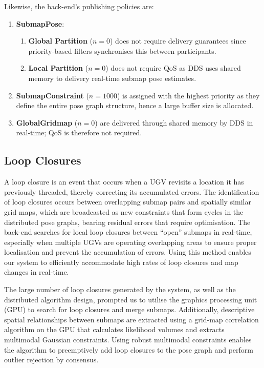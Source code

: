 
Likewise, the back-end’s publishing policies are:
\begin{enumerate}
	\item \textbf{SubmapPose}:
	\begin{enumerate}
		\item \textbf{Global Partition} ($n = 0$) does not require delivery guarantees since priority-based filters synchronises this between participants.
		\item \textbf{Local Partition} ($n = 0$) does not require QoS as DDS uses shared memory to delivery real-time submap pose estimates.
	\end{enumerate}
	\item \textbf{SubmapConstraint} ($n = 1000$) is assigned with the highest priority as they define the entire pose graph structure, hence a large buffer size is allocated.
	\item \textbf{GlobalGridmap} ($n = 0$) are delivered through shared memory by DDS in real-time; QoS is therefore not required.
\end{enumerate}

\subsection{Loop Closures}
A loop closure is an event that occurs when a UGV revisits a location it has previously threaded, thereby correcting its accumulated errors. The identification of loop closures occurs between overlapping submap pairs and spatially similar grid maps, which are broadcasted as new constraints that form cycles in the distributed pose graphs, bearing residual errors that require optimisation. The back-end searches for local loop closures between “open” submaps in real-time, especially when multiple UGVs are operating overlapping areas to ensure proper localisation and prevent the accumulation of errors. Using this method enables our system to efficiently accommodate high rates of loop closures and map changes in real-time.

The large number of loop closures generated by the system, as well as the distributed algorithm design, prompted us to utilise the graphics processing unit (GPU) to search for loop closures and merge submaps. Additionally, descriptive spatial relationships between submaps are extracted using a grid-map correlation algorithm on the GPU that calculates likelihood volumes and extracts multimodal Gaussian constraints. Using robust multimodal constraints enables the algorithm to preemptively add loop closures to the pose graph and perform outlier rejection by consensus.

